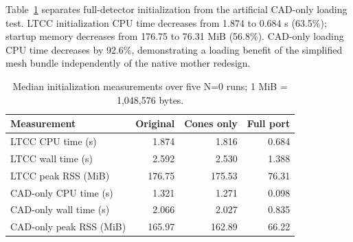 Table~\ref{tab:2} separates full-detector initialization from the artificial CAD-only loading test. LTCC
initialization CPU time decreases from 1.874 to 0.684 s (63.5\%); startup memory decreases from 176.75 to 76.31
MiB (56.8\%). CAD-only loading CPU time decreases by 92.6\%, demonstrating a loading benefit of the simplified
mesh bundle independently of the native mother redesign.

\begin{table}[htbp]

\caption{Median initialization measurements over five N=0 runs; 1 MiB = 1,048,576 bytes.}

\label{tab:2}

\centering

\small

\setlength{\tabcolsep}{4pt}

\renewcommand{\arraystretch}{1.15}

\begin{tabularx}{\textwidth}{@{}Xrrr@{}}

\toprule

Measurement & Original & Cones only & Full port \\

\midrule

LTCC CPU time (s) & 1.874 & 1.816 & 0.684 \\

LTCC wall time (s) & 2.592 & 2.530 & 1.388 \\

LTCC peak RSS (MiB) & 176.75 & 175.53 & 76.31 \\

CAD-only CPU time (s) & 1.321 & 1.271 & 0.098 \\

CAD-only wall time (s) & 2.066 & 2.027 & 0.835 \\

CAD-only peak RSS (MiB) & 165.97 & 162.89 & 66.22 \\

\bottomrule

\end{tabularx}

\end{table}
